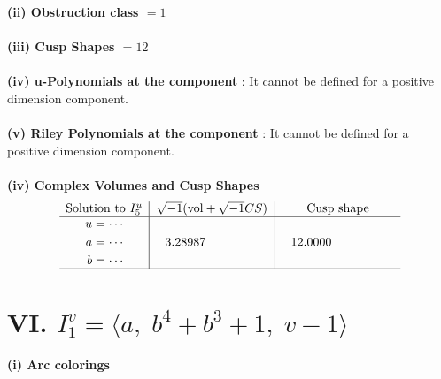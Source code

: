\documentclass[1p]{elsarticle_modified}
\theoremstyle{definition}
\newcommand{\I}{\sqrt{-1}}
\begin{document}
\flushleft \textbf{(ii) Obstruction class $= 1$}\\~\\
\flushleft \textbf{(iii) Cusp Shapes $= 12$}\\~\\
\flushleft \textbf{(iv) u-Polynomials at the component} : It cannot be defined for a positive dimension component.\\~\\
\flushleft \textbf{(v) Riley Polynomials at the component} : It cannot be defined for a positive dimension component.\\~\\
\newpage\flushleft \textbf{(iv) Complex Volumes and Cusp Shapes}
$$\begin{array}{c|c|c} 
\text{Solution to }I^u_{5}& \I (\text{vol} + \sqrt{-1}CS) & \text{Cusp shape}\\
 \hline 
\begin{aligned}
u &= \cdots \\
a &= \cdots \\
b &= \cdots\end{aligned}
 & \phantom{-}3.28987\phantom{ +0.000000I} & \phantom{-}12.0000\phantom{ +0.000000I}\\
 \hline 
 \end{array}
$$\newpage\renewcommand{\arraystretch}{1}
\centering \section*{VI. $I^v_{1}= \langle a,\;b^4+b^3+1,\;v-1 \rangle$}
\flushleft \textbf{(i) Arc colorings}\\
\end{document}
